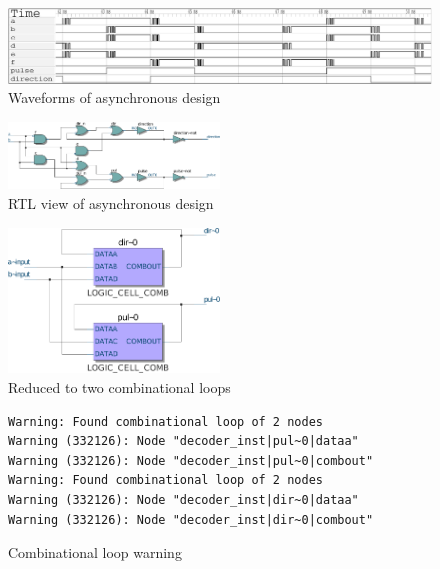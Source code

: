 \documentclass[a4paper]{article}
\begin{document}
\begin{figure}
\centering
\includegraphics[width=\textwidth]{asynchronous_quadrature_decoder_gtkwave.pdf}
\caption{Waveforms of asynchronous design}
\end{figure}
\begin{figure}
\centering
\includegraphics[width=0.5\textwidth]{asynchronous_quadrature_decoder_quartus_rtl.pdf}
\caption{RTL view of asynchronous design}
\end{figure}
\begin{figure}
\centering
\includegraphics[width=0.5\textwidth]{asynchronous_quadrature_decoder_quartus_map.pdf}
\caption{Reduced to two combinational loops}
\end{figure}
\begin{figure}
\centering
\begin{BVerbatim}
Warning: Found combinational loop of 2 nodes
Warning (332126): Node "decoder_inst|pul~0|dataa"
Warning (332126): Node "decoder_inst|pul~0|combout"
Warning: Found combinational loop of 2 nodes
Warning (332126): Node "decoder_inst|dir~0|dataa"
Warning (332126): Node "decoder_inst|dir~0|combout"
\end{BVerbatim}
\caption{Combinational loop warning}
\end{figure}
\end{document}
